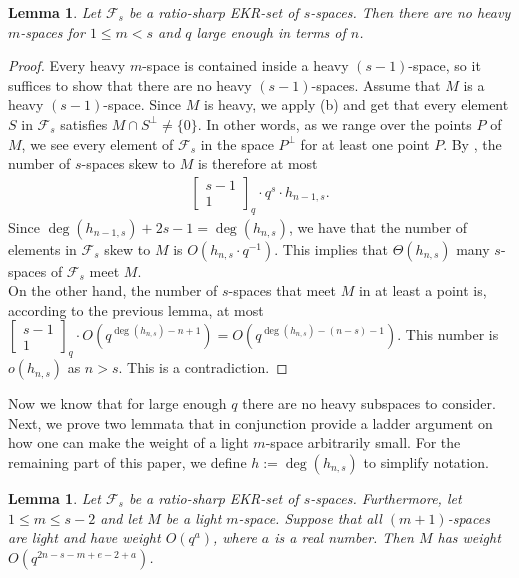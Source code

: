 \documentclass[11pt]{article}
\newtheorem{lemma}[thm]{Lemma}
\newcommand{\Gauss}[2]{{\begin{bmatrix} #1 \\ #2 \end{bmatrix}_q}}
\newcommand{\EKR}{\mathcal{F}}
\renewcommand{\leq}{\leqslant}
\begin{document}
\begin{lemma} \label{C:everything_is_light}
Let $\EKR_s$ be a ratio-sharp EKR-set of $s$-spaces. Then there are no heavy $m$-spaces for $1\leq m<s$ and $q$ large enough in terms of $n$.
\end{lemma}
\begin{proof}
Every heavy $m$-space is contained inside a heavy $(s-1)$-space, so it suffices to show that there are no heavy $(s-1)$-spaces. Assume that $M$ is a heavy $(s-1)$-space. Since $M$ is heavy, we apply  (b) and get that every element $S$ in $\EKR_s$ satisfies $M \cap S^\perp \neq \{0\}$. In other words, as we range over the points $P$ of $M$, we see every element of $\EKR_s$ in the space $P^\perp$ for at least one point $P$. By , the number of $s$-spaces skew to $M$ is therefore at most
    \begin{align*}
        \Gauss{s-1}{1} \cdot q^s \cdot h_{n-1,s}.
    \end{align*}
   Since $\deg(h_{n-1,s})+2s-1=\deg(h_{n,s})$, we have that the number of elements in $\EKR_s$ skew to $M$ is $ O(h_{n,s} \cdot q^{-1})$. This implies that $\Theta(h_{n,s})$ many $s$-spaces of $\EKR_s$ meet $M$.\\

   On the other hand, the number of $s$-spaces that meet $M$ in at least a point is, according to the previous lemma, at most $\Gauss{s-1}{1}\cdot O(q^{\deg(h_{n,s})-n+1})=O(q^{\deg(h_{n,s})-(n-s)-1})$. This number is $o(h_{n,s})$ as $n>s$. This is a contradiction.
\end{proof}

Now we know that for large enough $q$ there are no heavy subspaces to consider.
Next, we prove two lemmata that in conjunction provide a ladder argument on how one can make the weight of a light $m$-space arbitrarily small.  For the remaining part of this paper, we define $h:=\deg(h_{n,s})$ to simplify notation. 


\begin{lemma} \label{L:down_the_waterfall}
Let $\EKR_s$ be a ratio-sharp EKR-set of $s$-spaces.  Furthermore, let $1 \leq m \leq s-2$ and let $M$ be a light $m$-space. Suppose that all $(m+1)$-spaces are light and have weight $O(q^a)$, where $a$ is a real number. Then $M$  has weight $O(q^{2n-s-m+e-2+a})$.       
\end{lemma}
\end{document}
